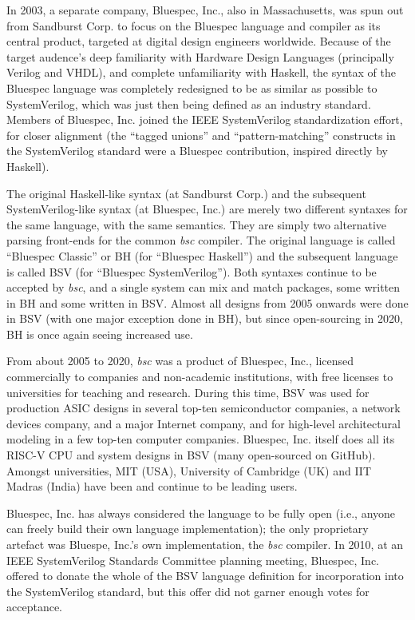 \documentclass[twoside,letterpaper]{article}
\newcommand{\BH}{BH}
\newcommand{\BSV}{BSV}
\newcommand{\bsc}{\emph{bsc}}
\begin{document}
In 2003, a separate company, Bluespec, Inc., also in Massachusetts,
was spun out from Sandburst Corp. to focus on the Bluespec language
and compiler as its central product, targeted at digital design
engineers worldwide.  Because of the target audence's deep familiarity
with Hardware Design Languages (principally Verilog and VHDL), and
complete unfamiliarity with Haskell, the syntax of the Bluespec
language was completely redesigned to be as similar as possible to
SystemVerilog, which was just then being defined as an industry
standard.  Members of Bluespec, Inc. joined the IEEE SystemVerilog
standardization effort, for closer alignment (the ``tagged unions''
and ``pattern-matching'' constructs in the SystemVerilog standard were
a Bluespec contribution, inspired directly by Haskell).

The original Haskell-like syntax (at Sandburst Corp.) and the
subsequent SystemVerilog-like syntax (at Bluespec, Inc.) are merely
two different syntaxes for the same language, with the same semantics.
They are simply two alternative parsing front-ends for the common
{\bsc} compiler.  The original language is called ``Bluespec Classic''
or {\BH} (for ``Bluespec Haskell'') and the subsequent language is
called {\BSV} (for ``Bluespec SystemVerilog'').  Both syntaxes
continue to be accepted by {\bsc}, and a single system can mix and
match packages, some written in BH and some written in BSV.  Almost
all designs from 2005 onwards were done in BSV (with one major
exception done in BH), but since open-sourcing in 2020, BH is once
again seeing increased use.

From about 2005 to 2020, {\bsc} was a product of Bluespec, Inc.,
licensed commercially to companies and non-academic institutions, with
free licenses to universities for teaching and research.  During this
time, BSV was used for production ASIC designs in several top-ten
semiconductor companies, a network devices company, and a major
Internet company, and for high-level architectural modeling in a few
top-ten computer companies.  Bluespec, Inc. itself does all its RISC-V
CPU and system designs in BSV (many open-sourced on GitHub).  Amongst
universities, MIT (USA), University of Cambridge (UK) and IIT Madras
(India) have been and continue to be leading users.

Bluespec, Inc. has always considered the language to be fully open
(i.e., anyone can freely build their own language implementation); the
only proprietary artefact was Bluespe, Inc.'s own implementation, the
{\bsc} compiler.  In 2010, at an IEEE SystemVerilog Standards
Committee planning meeting, Bluespec, Inc. offered to donate the whole
of the BSV language definition for incorporation into the
SystemVerilog standard, but this offer did not garner enough votes for
acceptance.
\end{document}
